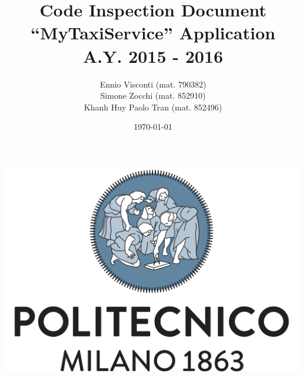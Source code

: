 \documentclass{article}
\title{ Code Inspection Document  
\\ ``MyTaxiService'' Application
\\ A.Y. 2015 - 2016 }
\author{Ennio Visconti (mat. 790382)
\\ Simone Zocchi (mat. 852910)
\\ Khanh Huy Paolo Tran (mat. 852496)}
\date{\today}
\begin{document}
   
    \begin{titlepage}
        \maketitle 
        \vfill
        \centerline{\includegraphics[scale=0.5]{LogoPolimi}}
        \vfill
        \vfill
    \end{titlepage}

        
    \tableofcontents






\end{document}
